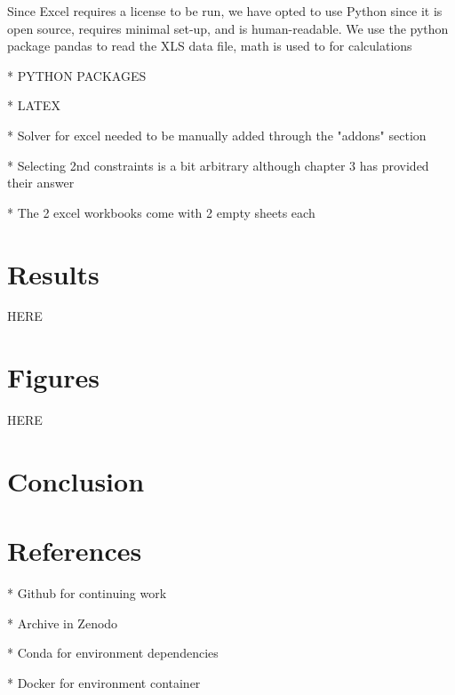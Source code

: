 \documentclass[acmtog]{acmart}
\begin{document}
Since Excel requires a license to be run, we have opted to use Python since it is open source, requires minimal set-up, and is human-readable. We use the python package pandas to read the XLS data file, math is used to for calculations 

* PYTHON PACKAGES

* LATEX

* Solver for excel needed to be manually added through the "addons" section

* Selecting 2nd constraints is a bit arbitrary although chapter 3 has provided their answer

* The 2 excel workbooks come with 2 empty sheets each

\section{Results}
HERE

\section{Figures}
HERE

\section{Conclusion}

\section{References}
* Github for continuing work

* Archive in Zenodo

* Conda for environment dependencies

* Docker for environment container
\end{document}
